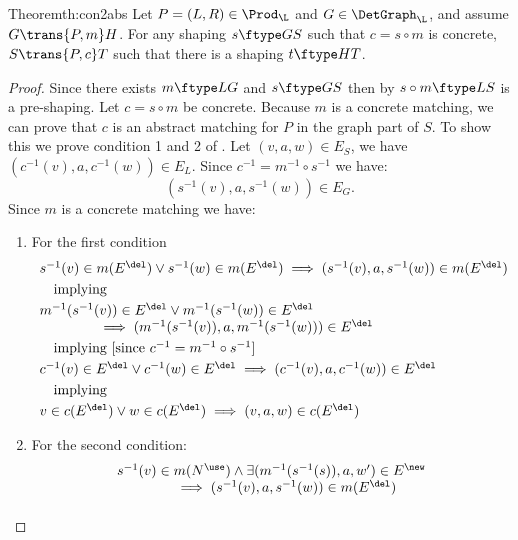 \begin{oldresult}{Theorem}{th:con2abs}
  Let $P=(L,R)\in \Prod_\L$ and $G\in \DetGraph_\L$, and assume $G\trans{P,m} H$.
  For any shaping $s\ftype G S$ such that $c=s\circ m$ is concrete,
  $S\trans{P,c} T$ such that there is a shaping $t\ftype H T$.
\end{oldresult}
%
\begin{proof}
  Since there exists $m \ftype L G$ and $s \ftype G S$ then by
   $s \circ m \ftype L S$ is a pre-shaping.  Let $c=s \circ
  m$ be concrete. Because $m$ is a concrete matching, we can prove that $c$ is
  an abstract matching for $P$ in the graph part of $S$.  
  To show this we prove condition 1 and 2 of . Let
  $(v,a,w) \in E_S$, we have $(c^{-1}(v),a,c^{-1}(w)) \in E_L$. Since
  $c^{-1}=m^{-1} \circ s^{-1}$ we have:
\[
(s^{-1}(v),a,s^{-1}(w)) \in E_G.
\] 
Since $m$ is a concrete matching we have: 
\begin{enumerate}
\item For the first condition
\[
\begin{array}{l}
 s^{-1}(v) \in m(E^\del) \vee s^{-1}(w) \in m(E^\del)
                \implies (s^{-1}(v),a,s^{-1}(w)) \in m(E^\del) 
\\[\smallskipamount]
\quad\mbox{implying}
\\[\smallskipamount]
 m^{-1}(s^{-1}(v)) \in E^\del \vee m^{-1}(s^{-1}(w)) \in E^\del \\
\qquad\qquad {} \implies (m^{-1}(s^{-1}(v)),a,m^{-1}(s^{-1}(w))) \in E^\del
\\[\smallskipamount]
\quad\mbox{implying [since $c^{-1}=m^{-1}\circ s^{-1}$]}
\\[\smallskipamount]
 c^{-1}(v) \in E^\del \vee c^{-1}(w) \in E^\del
                \implies (c^{-1}(v),a,c^{-1}(w)) \in E^\del
\\[\smallskipamount]
\quad\mbox{implying}
\\[\smallskipamount]
 v \in c(E^\del) \vee w \in c(E^\del)
                \implies (v,a,w) \in c(E^\del) 
\end{array}
\]
%
\item For the second condition:
\[
\begin{array}{ll}
s^{-1}(v) \in m(N^\use) \wedge \exists (m^{-1}(s^{-1}(s)),a,w') \in E^\new \\
\qquad\qquad {} \implies (s^{-1}(v),a,s^{-1}(w)) \in m(E^\del)
\\[\smallskipamount]

\end{array}\]
\end{enumerate}
\end{proof}
